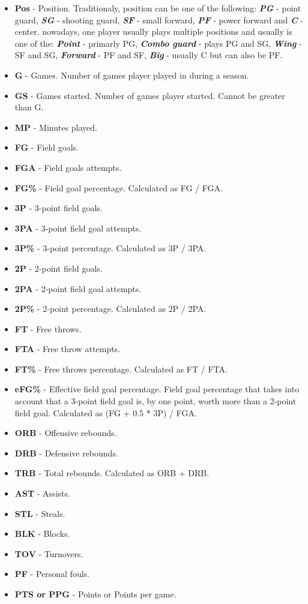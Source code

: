 \documentclass[a4paper]{article}
\begin{document}
\begin{itemize}
	\item \textbf{Pos} - Position. Traditionaly, position can be one of the following: \textit{\textbf{PG}} - point guard, \textit{\textbf{SG}} - shooting guard, \textit{\textbf{SF}} - small forward, \textit{\textbf{PF}} - power forward and \textit{\textbf{C}} - center. nowadays, one player usually plays multiple positions and usually is one of the: \textit{\textbf{Point}} - primarly PG, \textit{\textbf{Combo guard}} - plays PG and SG, \textit{\textbf{Wing}} - SF and SG, \textit{\textbf{Forward}} - PF and SF, \textit{\textbf{Big}} - usually C but can also be PF.
	\item \textbf{G} - Games. Number of games player played in during a season.
	\item \textbf{GS} - Games started. Number of games player started. Cannot be greater than G.
	\item \textbf{MP} - Minutes played.
	\item \textbf{FG} - Field goals.
	\item \textbf{FGA} - Field goals attempts.
	\item \textbf{FG\%} - Field goal percentage. Calculated as FG / FGA.
	\item \textbf{3P} - 3-point field goals.
	\item \textbf{3PA} - 3-point field goal attempts.
	\item \textbf{3P\%} - 3-point percentage. Calculated as 3P / 3PA.
	\item \textbf{2P} - 2-point field goals. 
	\item \textbf{2PA} - 2-point field goal attempts.
	\item \textbf{2P\%} - 2-point percentage. Calculated as 2P / 2PA.
	\item \textbf{FT} - Free throws.
	\item \textbf{FTA} - Free throw attempts.
	\item \textbf{FT\%} - Free throws percentage. Calculated as FT / FTA.
	\item \textbf{eFG\%} - Effective field goal percentage. Field goal percentage that takes into account that a 3-point field goal is, by one point, worth more than a 2-point field goal. Calculated as (FG + 0.5 * 3P) / FGA.
	\item \textbf{ORB} - Offensive rebounds.
	\item \textbf{DRB} - Defensive rebounds.
	\item \textbf{TRB} - Total rebounds. Calculated as ORB + DRB.
	\item \textbf{AST} - Assists.
	\item \textbf{STL} - Steals.
	\item \textbf{BLK} - Blocks.
	\item \textbf{TOV} - Turnovers.
	\item \textbf{PF} - Personal fouls.
	\item \textbf{PTS or PPG} - Points or Points per game.	
\end{itemize}	
	
\end{document}
